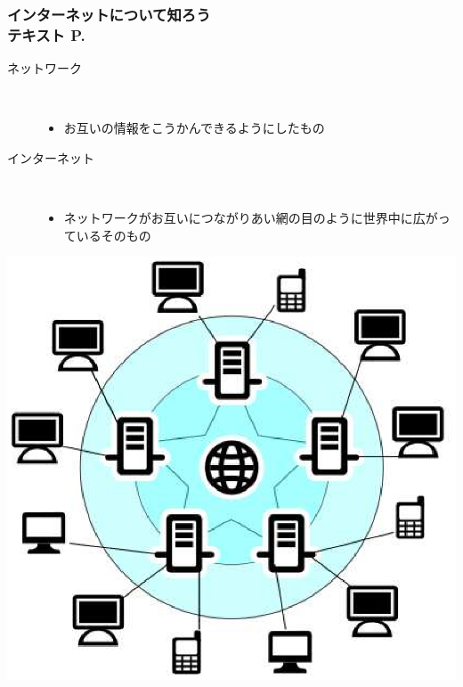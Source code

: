 \begin{frame}[fragile]
    \frametitle{インターネットについて知ろう\\テキスト P.\pageref{1:P:internet}~~~}
		\begin{description}
			\item[ネットワーク] ~\\
				\begin{itemize}\small
					\item お互いの情報をこうかんできるようにしたもの
				\end{itemize}

			\item[インターネット]~\\
				\begin{itemize}\small
					\item ネットワークがお互いにつながりあい網の目のように世界中に広がっているそのもの
				\end{itemize}
		\end{description}
		\vfill
        \begin{minipage}{0.5\textwidth}
            {\upshape\includegraphics[scale=0.3]{text07-img/ome7-img002.eps}}
        \end{minipage}
\end{frame}

